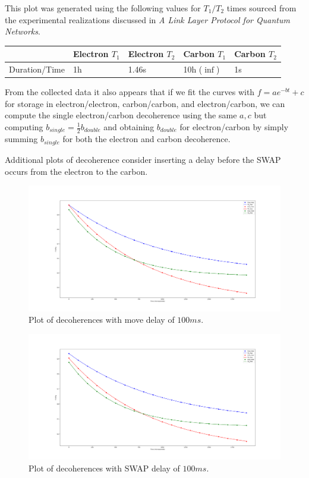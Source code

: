 \documentclass{article}
\begin{document}
This plot was generated using the following values for $T_1/T_2$ times sourced from the experimental realizations discussed in \emph{A Link Layer Protocol for Quantum Networks}.

\begin{table}[!htb]
\centering
\begin{tabular}{|l|l|l|l|l|}
\hline
              & Electron $T_1$ & Electron $T_2$ & Carbon $T_1$ & Carbon $T_2$ \\
\hline
Duration/Time & 1h            & 1.46s       & 10h ($\inf$) & 1s          \\
\hline
\end{tabular}
\end{table}

From the collected data it also appears that if we fit the curves with $f=ae^{-bt}+c$ for storage in electron/electron, carbon/carbon, and electron/carbon, we can compute the single electron/carbon decoherence using the same $a,c$ but computing $b_{single}=
\frac{1}{2}b_{double}$ and obtaining $b_{double}$ for electron/carbon by simply summing $b_{single}$ for both the electron and carbon decoherence.

Additional plots of decoherence consider inserting a delay before the SWAP occurs from the electron to the carbon.
\begin{figure}[!htb]
    \centering
    \includegraphics[width=\textwidth]{figures/decoherence_move_delay_0ms.png}
    \caption{Plot of decoherences with move delay of $100ms$.}
    \label{fig:decoherence_0_delay}
\end{figure}

\begin{figure}[!htb]
    \centering
    \includegraphics[width=\textwidth]{figures/decoherence_move_delay_100ms.png}
    \caption{Plot of decoherences with SWAP delay of $100ms$.}
    \label{fig:decoherence_100_delay}
\end{figure}
\end{document}

